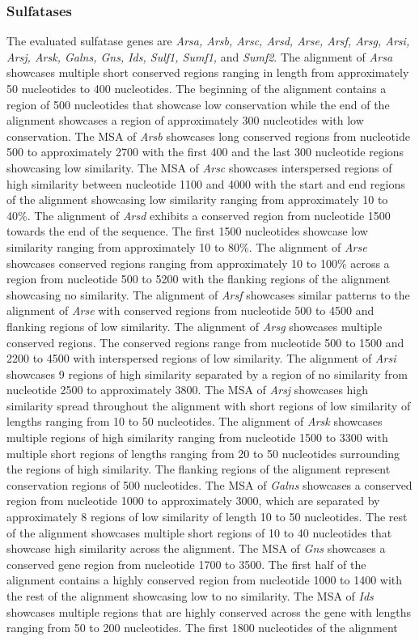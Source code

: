 \documentclass{article}
\begin{document}
\subsubsection*{Sulfatases}
The evaluated sulfatase genes are \textit{Arsa, Arsb, Arsc, Arsd, Arse, Arsf, Arsg, Arsi, Arsj, Arsk, Galns, Gns, Ids, Sulf1, Sumf1,} and \textit{Sumf2}. The alignment of \textit{Arsa} showcases multiple short conserved regions ranging in length from approximately 50 nucleotides  to 400 nucleotides. The beginning of the alignment contains a region of 500 nucleotides that showcase low conservation while the end of the alignment showcases a region of approximately 300 nucleotides with low conservation. The MSA of \textit{Arsb} showcases long conserved regions from nucleotide 500 to approximately 2700 with the first 400 and the last 300 nucleotide regions showcasing low similarity. The MSA of \textit{Arsc} showcases interspersed regions of high similarity between nucleotide 1100 and 4000 with the start and end regions of the alignment showcasing low similarity ranging from approximately 10 to 40\%. The alignment of \textit{Arsd} exhibits a conserved region from nucleotide 1500 towards the end of the sequence. The first 1500 nucleotides showcase low similarity ranging from approximately 10 to 80\%. The alignment of \textit{Arse} showcases conserved regions ranging from approximately 10 to 100\% across a region from nucleotide 500 to 5200 with the flanking regions of the alignment showcasing no similarity. The alignment of \textit{Arsf} showcases similar patterns to the alignment of \textit{Arse} with conserved regions from nucleotide 500 to 4500 and flanking regions of low similarity. The alignment of \textit{Arsg} showcases multiple conserved regions. The conserved regions range from nucleotide 500 to 1500 and 2200 to 4500 with interspersed regions of low similarity. The alignment of \textit{Arsi} showcases 9 regions of high similarity separated by a region of no similarity from nucleotide 2500 to approximately 3800. The MSA of \textit{Arsj} showcases high similarity spread throughout the alignment with short regions of low similarity of lengths ranging from 10 to 50 nucleotides. The alignment of \textit{Arsk} showcases multiple regions of high similarity ranging from nucleotide 1500 to 3300 with multiple short regions of lengths ranging from 20 to 50 nucleotides surrounding the regions of high similarity. The flanking regions of the alignment represent conservation regions of 500 nucleotides. The MSA of \textit{Galns} showcases a conserved region from nucleotide 1000 to approximately 3000, which are separated by approximately 8 regions of low similarity of length 10 to 50 nucleotides. The rest of the alignment showcases multiple short regions of 10 to 40 nucleotides that showcase high similarity across the alignment. The MSA of \textit{Gns} showcases a conserved gene region from nucleotide 1700 to 3500. The first half of the alignment contains a highly conserved region from nucleotide 1000 to 1400 with the rest of the alignment showcasing low to no similarity. The MSA of \textit{Ids} showcases multiple regions that are highly conserved across the gene with lengths ranging from 50 to 200 nucleotides. The first 1800 nucleotides of the alignment 
\end{document}
